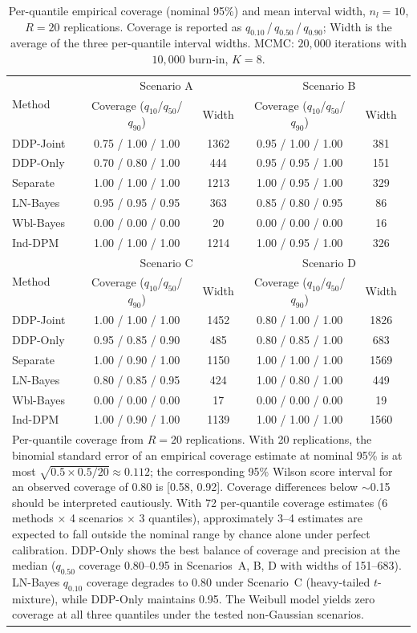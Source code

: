\documentclass[a4paper,fleqn,longmktitle]{cas-sc}
\begin{document}
\begin{table}
\centering
\caption{Per-quantile empirical coverage (nominal 95\%) and mean interval width, $n_l = 10$, $R = 20$ replications. Coverage is reported as $q_{0.10}$\,/\,$q_{0.50}$\,/\,$q_{0.90}$; Width is the average of the three per-quantile interval widths. MCMC: $20{,}000$ iterations with $10{,}000$ burn-in, $K=8$.}
\label{tab:sim_coverage}
\begin{tabular}{lcccc}
\toprule
\multirow{2}{*}{Method} & \multicolumn{2}{c}{Scenario A} & \multicolumn{2}{c}{Scenario B} \\
 & Coverage ($q_{10}$/$q_{50}$/$q_{90}$) & Width & Coverage ($q_{10}$/$q_{50}$/$q_{90}$) & Width \\
\midrule
DDP-Joint & 0.75 / 1.00 / 1.00 & 1362 & 0.95 / 1.00 / 1.00 & 381 \\
DDP-Only  & 0.70 / 0.80 / 1.00 & 444 & 0.95 / 0.95 / 1.00 & 151 \\
Separate  & 1.00 / 1.00 / 1.00 & 1213 & 1.00 / 0.95 / 1.00 & 329 \\
LN-Bayes   & 0.95 / 0.95 / 0.95 & 363 & 0.85 / 0.80 / 0.95 & 86 \\
Wbl-Bayes  & 0.00 / 0.00 / 0.00 & 20 & 0.00 / 0.00 / 0.00 & 16 \\
Ind-DPM    & 1.00 / 1.00 / 1.00 & 1214 & 1.00 / 0.95 / 1.00 & 326 \\
\midrule
\multirow{2}{*}{Method} & \multicolumn{2}{c}{Scenario C} & \multicolumn{2}{c}{Scenario D} \\
 & Coverage ($q_{10}$/$q_{50}$/$q_{90}$) & Width & Coverage ($q_{10}$/$q_{50}$/$q_{90}$) & Width \\
\midrule
DDP-Joint & 1.00 / 1.00 / 1.00 & 1452 & 0.80 / 1.00 / 1.00 & 1826 \\
DDP-Only  & 0.95 / 0.85 / 0.90 & 485 & 0.80 / 0.85 / 1.00 & 683 \\
Separate  & 1.00 / 0.90 / 1.00 & 1150 & 1.00 / 1.00 / 1.00 & 1569 \\
LN-Bayes   & 0.80 / 0.85 / 0.95 & 424 & 1.00 / 0.80 / 1.00 & 449 \\
Wbl-Bayes  & 0.00 / 0.00 / 0.00 & 17 & 0.00 / 0.00 / 0.00 & 19 \\
Ind-DPM    & 1.00 / 0.90 / 1.00 & 1139 & 1.00 / 1.00 / 1.00 & 1560 \\
\bottomrule
\multicolumn{5}{p{\textwidth}}{\footnotesize Per-quantile coverage from $R=20$ replications. With 20 replications, the binomial standard error of an empirical coverage estimate at nominal 95\% is at most $\sqrt{0.5\times0.5/20}\approx0.112$; the corresponding 95\% Wilson score interval for an observed coverage of 0.80 is [0.58, 0.92]. Coverage differences below $\sim$0.15 should be interpreted cautiously. With 72 per-quantile coverage estimates (6 methods $\times$ 4 scenarios $\times$ 3 quantiles), approximately 3--4 estimates are expected to fall outside the nominal range by chance alone under perfect calibration. DDP-Only shows the best balance of coverage and precision at the median ($q_{0.50}$ coverage 0.80--0.95 in Scenarios~A, B, D with widths of 151--683). LN-Bayes $q_{0.10}$ coverage degrades to 0.80 under Scenario~C (heavy-tailed $t$-mixture), while DDP-Only maintains 0.95. The Weibull model yields zero coverage at all three quantiles under the tested non-Gaussian scenarios.}

\end{tabular}
\end{table}
\end{document}
